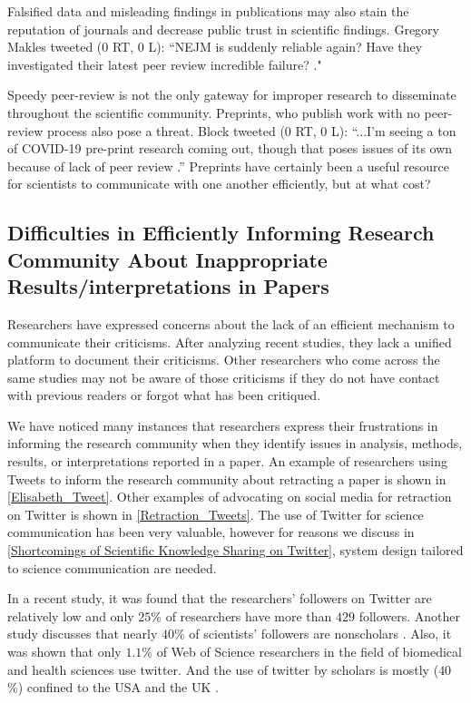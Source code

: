 \documentclass[acmsmall,authordraft]{acmart}
\begin{document}
Falsified data and misleading findings in publications may also stain the reputation of journals and decrease public trust in scientific findings. Gregory Makles tweeted ($0$ RT, $0$ L): ``NEJM is suddenly reliable again? Have they investigated their latest peer review incredible failure? \citep{Makles2020twitter}." 

Speedy peer-review is not the only gateway for improper research to disseminate throughout the scientific community. Preprints, who publish work with no peer-review process also pose a threat.
Block tweeted ($0$ RT, $0$ L): ``...I'm seeing a ton of COVID-19 pre-print research coming out, though that poses issues of its own because of lack of peer review \citet{Block2020twitter}.'' 
Preprints have certainly been a useful resource for scientists to communicate with one another efficiently, but at what cost?


\subsection{Difficulties in Efficiently Informing Research Community About Inappropriate Results/interpretations in Papers}
\label{Difficulties in efficiently informing research community about inappropriate results/interpretations in papers}

Researchers have expressed concerns about the lack of an efficient mechanism to communicate their criticisms. After analyzing recent studies, they lack a unified platform to document their criticisms. Other researchers who come across the same studies may not be aware of those criticisms if they do not have contact with previous readers or forgot what has been critiqued. 

We have noticed many instances that researchers express their frustrations in informing the research community when they identify issues in analysis, methods, results, or interpretations reported in a paper. An example of researchers using Tweets to inform the research community about retracting a paper is shown in \autoref{Elisabeth_Tweet}. Other examples of advocating on social media for retraction on Twitter is shown in \autoref{Retraction_Tweets}. The use of Twitter for science communication has been very valuable, however for reasons we discuss in \autoref{Shortcomings of Scientific Knowledge Sharing on Twitter}, system design tailored to science communication are needed.

In a recent study, it was found that the researchers' followers on Twitter are relatively low and only $25$\% of researchers have more than $429$ followers\citep{costas2020comparison}. Another study discusses that nearly $40$\% of scientists' followers are nonscholars \citep{cote2018scientists}. 
Also, it was shown that only $1.1$\% of Web of Science researchers in the field of biomedical and health sciences use twitter. And the use of twitter by scholars is mostly ($40$\%) confined to the USA and the UK \citep{costas2020large}.
\end{document}
